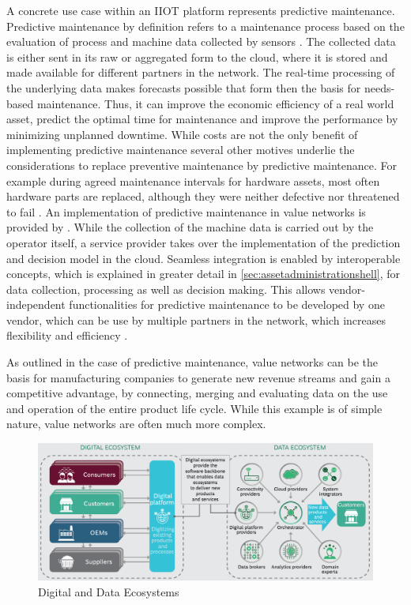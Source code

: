 A concrete use case within an \ac{IIOT} platform represents predictive maintenance. Predictive maintenance by definition refers to a maintenance process based on the evaluation of process and machine data collected by sensors \cite[p. 1670]{Selcuk2016PredictiveTrends:}. The collected data is either sent in its raw or aggregated form to the cloud, where it is stored and made available for different partners in the network. The real-time processing of the underlying data makes forecasts possible that form then the basis for needs-based maintenance. Thus, it can improve the economic efficiency of a real world asset, predict the optimal time for maintenance and improve the performance by minimizing unplanned downtime. While costs are not the only benefit of implementing predictive maintenance several other motives underlie the considerations to replace preventive maintenance by predictive maintenance. For example during agreed maintenance intervals for hardware assets, most often hardware parts are replaced, although they were neither defective nor threatened to fail \cite[p. 1672]{Selcuk2016PredictiveTrends:}. An implementation of predictive maintenance in value networks is provided by \citet[p. 11]{Cavalieri2020AShell}. While the collection of the machine data is carried out by the operator itself, a service provider takes over the implementation of the prediction and decision model in the cloud. Seamless integration is enabled by interoperable concepts, which is explained in greater detail in \ref{sec:assetadministrationshell}, for data collection, processing as well as decision making. This allows vendor-independent functionalities for predictive maintenance to be developed by one vendor, which can be use by multiple partners in the network, which increases flexibility and efficiency \cite[p. 9]{Cavalieri2020AShell}.

As outlined in the case of predictive maintenance, value networks can be the basis for manufacturing companies to generate new revenue streams and gain a competitive advantage, by connecting, merging and evaluating data on the use and operation of the entire product life cycle. While this example is of simple nature, value networks are often much more complex.

\begin{figure}[h]
\includegraphics[scale=0.35]{content/pictures/digital_ecosystems_bcg.png}
\caption{Digital and Data Ecosystems}
\label{fig:valuenetworksi40}
\end{figure}

